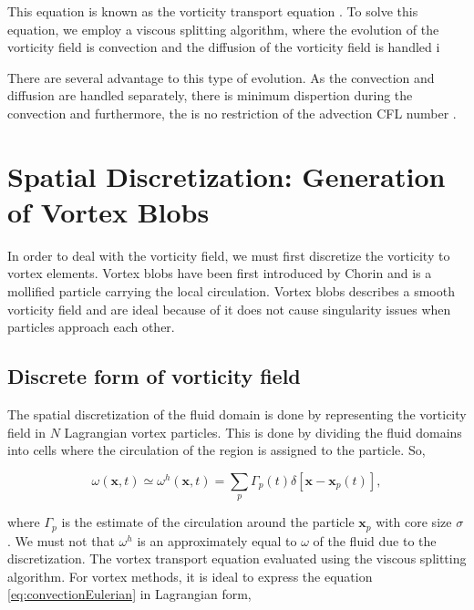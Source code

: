 This equation is known as the vorticity transport equation \cite{LEONARD1995}. To solve this equation, we employ a viscous splitting algorithm, where the evolution of the vorticity field is convection and the diffusion of the vorticity field is handled i

There are several advantage to this type of evolution. As the convection and diffusion are handled separately, there is minimum dispertion during the convection and furthermore, the is no restriction of the advection CFL number \cite{Wee2006}.


\section{Spatial Discretization: Generation of Vortex Blobs}

In order to deal with the vorticity field, we must first discretize the vorticity to vortex elements. Vortex blobs have been first introduced by Chorin and is a mollified particle carrying the local circulation. Vortex blobs describes a smooth vorticity field and are ideal because of it does not cause singularity issues when particles approach each other.

\subsection{Discrete form of vorticity field}
The spatial discretization of the fluid domain is done by representing the vorticity field in $N$ Lagrangian vortex particles. This is done by dividing the fluid domains into cells where the circulation of the region is assigned to the particle. So,

	\begin{equation}
	\omega\left(\mathbf{x},t\right) \simeq \omega^h\left(\mathbf{x},t\right) = \sum_{p}\Gamma_p\left(t\right)\delta \left[\mathbf{x}-\mathbf{x}_p\left(t\right)\right],
	\end{equation}

where $\Gamma_p$ is the estimate of the circulation around the particle $\mathbf{x}_p$ with core size $\sigma$. We must not that $\omega^h$ is an approximately equal to $\omega$ of the fluid due to the discretization.
%
The vortex transport equation evaluated using the viscous splitting algorithm. For vortex methods, it is ideal to express the equation \ref{eq:convectionEulerian} in Lagrangian form,


